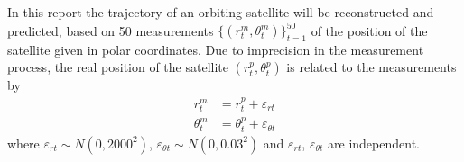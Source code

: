 \def\assignmenttitle{Estimating the Trajectory of a Satellite}
\def\assignmentnumber{5}
\def\assignmentdate{02-12-2011}
\def\githuburl{\small\url{https://github.com/alphabits/dtu-fall-2011/tree/master/02417/assignment-5}}
\def\githuburlfoot{\footnotesize\url{https://github.com/alphabits/dtu-fall-2011/tree/master/02417/assignment-5}}

\def\myepsilon{\varepsilon}
\def\erm{\myepsilon_{rt}}
\def\etm{\myepsilon_{\theta t}}
\def\erp{\myepsilon^p_{rt}}
\def\etp{\myepsilon^p_{\theta t}}
\def\evp{\myepsilon^p_{v_\theta t}}
\def\vecX{\myvec{X}}
\def\vecYt{\myvec{Y}_t}
\def\vece{\myvec{e}}
\def\vecSigma{\myvec{\Sigma}}
\def\vecA{\myvec{A}}
\def\vecC{\myvec{C}}






\maketitle

In this report the trajectory of an orbiting satellite will be reconstructed and predicted, based on 50 measurements $\{(r_t^m, \theta_t^m)\}_{t=1}^{50}$ of the position of the satellite given in polar coordinates. Due to imprecision in the measurement process, the real position of the satellite $(r_t^p, \theta_t^p)$ is related to the measurements by
\begin{align*}
    r_t^m &= r_t^p + \erm \\
    \theta_t^m &= \theta_t^p + \etm
\end{align*}
where $\erm\sim N(0,2000^2)$, $\etm\sim N(0,0.03^2)$ and $\erm$, $\etm$ are independent.

